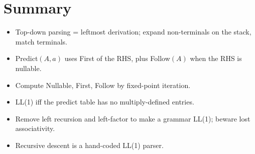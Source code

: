 \section{Summary}
\begin{itemize}
  \item Top-down parsing = leftmost derivation; expand non-terminals on the stack, match terminals.
  \item Predict$(A,a)$ uses First of the RHS, plus Follow$(A)$ when the RHS is nullable.
  \item Compute Nullable, First, Follow by fixed-point iteration.
  \item LL(1) iff the predict table has no multiply-defined entries.
  \item Remove left recursion and left-factor to make a grammar LL(1); beware lost associativity.
  \item Recursive descent is a hand-coded LL(1) parser.
\end{itemize}
